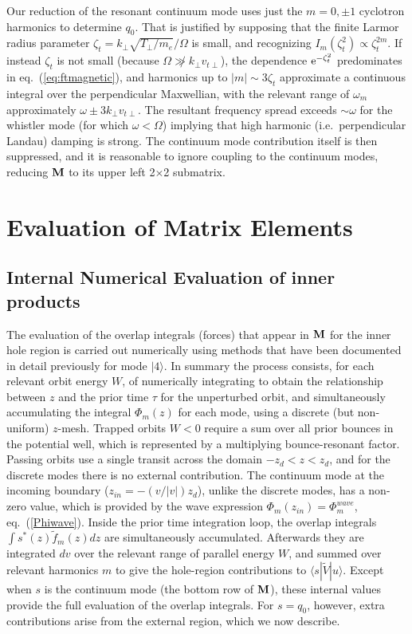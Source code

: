 \documentclass{jpp}
\def\ket#1{|#1\rangle}
\def\bra#1{\langle#1}
\def\etothe#1{{\rm e}^{#1}}
\def\M{{\bf M}}
\begin{document}
Our reduction of the resonant continuum mode uses just the $m=0,\pm 1$
cyclotron harmonics to determine $q_{0}.$ That is justified by
supposing that the finite Larmor radius parameter
$\zeta_t=k_\perp\sqrt{T_\perp/m_e}/\Omega$ is small, and recognizing
$I_m(\zeta_t^2)\propto \zeta_t^{2m}$. If instead $\zeta_t$ is not small (because
$\Omega\not\gg k_\perp v_{t\perp}$), the dependence
$\etothe{-\zeta_t^2}$ predominates in eq.\ (\ref{eq:ftmagnetic}), and
harmonics up to $|m|\sim 3\zeta_t$ approximate a continuous integral
over the perpendicular Maxwellian, with the relevant range of
$\omega_m$ approximately $\omega\pm 3k_\perp v_{t\perp}$. The
resultant frequency spread exceeds $\sim\omega$ for the whistler mode
(for which $\omega < \Omega$) implying that high harmonic
(i.e.\ perpendicular Landau) damping is strong. The continuum mode
contribution itself is then suppressed, and it is reasonable to ignore
coupling to the continuum modes, reducing $\M$ to its upper left
2$\times$2 submatrix.

\section{Evaluation of Matrix Elements}
\subsection{Internal Numerical Evaluation of inner products}

The evaluation of the overlap integrals (forces) that appear in $\M$
for the inner hole region is carried out numerically using methods
that have been documented in detail previously
\citep{Hutchinson2018a}
for mode $\ket{4}$. In summary the process consists, for each relevant
orbit energy $W$, of numerically integrating to obtain the
relationship between $z$ and the prior time $\tau$ for the unperturbed
orbit, and simultaneously accumulating the integral $\Phi_m(z)$ for
each mode, using a discrete (but non-uniform) $z$-mesh.  Trapped
orbits $W<0$ require a sum over all prior bounces in the potential
well, which is represented by a multiplying bounce-resonant
factor. Passing orbits use a single transit across the domain
$-z_d<z<z_d$, and for the discrete modes there is no external
contribution. The continuum mode at the incoming boundary
($z_{in}=-(v/|v|)z_d$), unlike the discrete modes, has a non-zero
value, which is provided by the wave expression
$\Phi_m(z_{in})=\Phi_m^{wave}$, eq.\ (\ref{Phiwave}).  Inside the
prior time integration loop, the overlap integrals
$\int s^*(z)\tilde f_m(z)dz$ are simultaneously
accumulated. Afterwards they are integrated $dv$ over the relevant
range of parallel energy $W$, and summed over relevant harmonics $m$
to give the hole-region contributions to $\bra{s}|\tilde
V\ket{u}$. Except when $s$ is the continuum mode (the bottom row of
$\M$), these internal values provide the full evaluation of the
overlap integrals. For $s=q_0$, however, extra contributions arise
from the external region, which we now describe.
\end{document}

